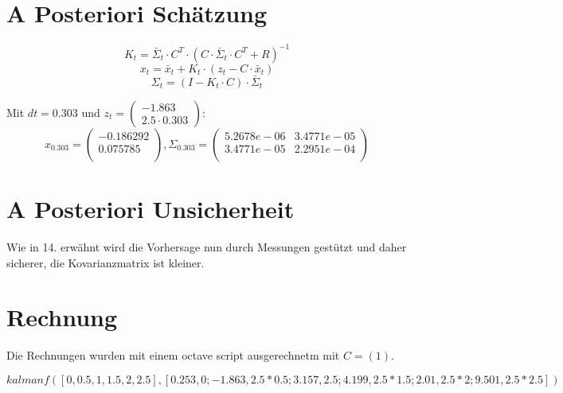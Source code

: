 \documentclass[12pt,a4paper]{article}
\begin{document}
\section{A Posteriori Schätzung}
\[
K_t = \bar{\Sigma}_t \cdot C^T \cdot (C \cdot \bar{\Sigma}_t \cdot C^T + R)^{-1}
\]
\[
x_t = \bar{x}_t + K_t \cdot (z_t - C \cdot \bar{x}_t)
\]
\[
\Sigma_t = (I - K_t \cdot C) \cdot \bar{\Sigma}_t
\]

Mit $dt = 0.303$ und $z_t = \begin{pmatrix}
-1.863 \\
2.5 \cdot 0.303
\end{pmatrix}$:
\[
x_{0.303} = \begin{pmatrix}
  -0.186292 \\ 0.075785\\
\end{pmatrix}, \Sigma_{0.303} = 
\begin{pmatrix}
   5.2678e-06  & 3.4771e-05\\
   3.4771e-05  & 2.2951e-04\\
\end{pmatrix}
\]

\section{A Posteriori Unsicherheit}
Wie in 14. erwähnt wird die Vorhersage nun durch Messungen gestützt und daher sicherer, die Kovarianzmatrix ist kleiner.

\section{Rechnung}
Die Rechnungen wurden mit einem octave script ausgerechnetm mit $C = (1)$.

$kalmanf([0, 0.5, 1,1.5,2,2.5], [0.253, 0; -1.863, 2.5*0.5; 3.157, 2.5; 4.199, 2.5*1.5; 2.01, 2.5*2;9.501, 2.5*2.5])$
\end{document}
